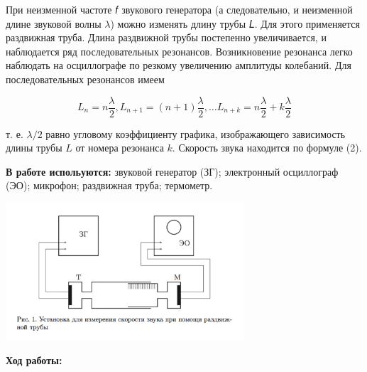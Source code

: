 \documentclass[10pt]{article}
\begin{document}
    При неизменной частоте 𝑓 звукового генератора (а следовательно, и неизменной длине звуковой волны $\lambda$) можно изменять длину трубы 𝐿. Для этого применяется раздвижная труба. Длина раздвижной трубы постепенно увеличивается, и наблюдается ряд последовательных резонансов. Возникновение резонанса легко наблюдать на осциллографе по резкому увеличению амплитуды колебаний. Для последовательных резонансов имеем

    \begin{equation}
        L_n = n\frac{\lambda}{2}, L_{n+1} = (n+1)\frac{\lambda}{2}, \dots L_{n+k} = n\frac{\lambda}{2} + k\frac{\lambda}{2}
    \end{equation}
    
    т. е. $\lambda/2$ равно угловому коэффициенту графика, изображающего зависимость длины трубы $L$ от номера резонанса $k$. Скорость звука находится по формуле (2).

    \textbf{В работе испольуются:} звуковой генератор (ЗГ); электронный осциллограф (ЭО); микрофон; раздвижная труба; термометр.

    \begin{center} 
    \includegraphics[width=3.5in]{stand.png}
    \end{center}

    \textbf{Ход работы:}
\end{document}
